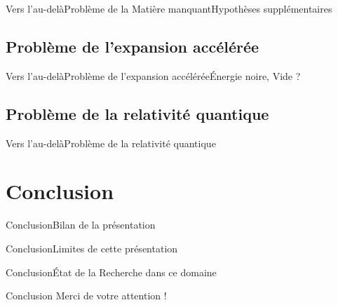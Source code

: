 \documentclass[handout,8pt]{beamer} %
\begin{document}
\begin{frame}{Vers l’au-delà}{Problème de la Matière manquant}{Hypothèses supplémentaires}

\end{frame}

\subsection{Problème de l’expansion accélérée}
\begin{frame}{Vers l’au-delà}{Problème de l’expansion accélérée}{Énergie noire, Vide ?}

\end{frame}

\subsection{Problème de la relativité quantique}
\begin{frame}{Vers l’au-delà}{Problème de la relativité quantique}

\end{frame}


\section*{Conclusion}

\begin{frame}
\end{frame}

\begin{frame}{Conclusion}{Bilan de la présentation}

\end{frame}

\begin{frame}{Conclusion}{Limites de cette présentation}

\end{frame}

\begin{frame}{Conclusion}{État de la Recherche dans ce domaine}

\end{frame}

\begin{frame}{Conclusion}
Merci de votre attention !
\end{frame}
\end{document}
